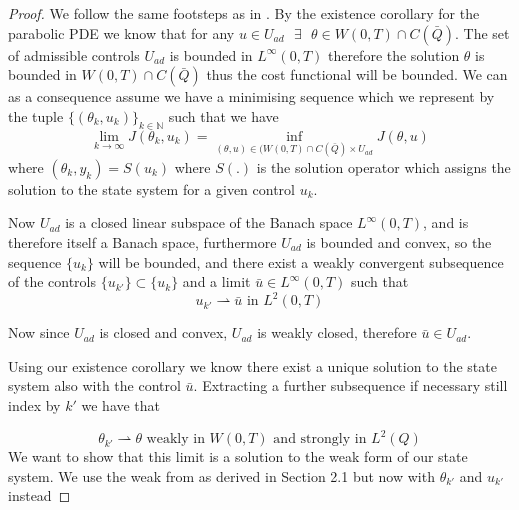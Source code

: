 \begin{proof}
We follow the same footsteps as in  \cite{DPSteel}. By the existence corollary for the parabolic PDE we know that  for any $u \in U_{ad} \text{ } \exists \text{ }\theta \in W(0,T)\cap C(\bar{Q})$. The set of admissible controls $U_{ad}$ is bounded in $L^{\infty}(0,T)$ therefore the solution $\theta$ is bounded in $W(0,T) \cap C(\bar{Q})$ thus the cost functional will be bounded. We can as a consequence assume we have a minimising sequence which we represent by the tuple $\{(\theta_k,u_k)\}_{k\in \mathbb{N}}$ such that we have 
\begin{equation*}
    \lim_{k\rightarrow \infty}J(\theta_k,u_k) = \inf_{(\theta,u)\in (W(0,T) \cap C(\bar{Q})\times U_{ad}}J(\theta,u)
\end{equation*}
where $(\theta_k,y_k) = S(u_k)$ where $S(.)$ is the solution operator which assigns the solution to the state system for a given control $u_k$.

Now $U_{ad}$ is a closed linear subspace of the Banach space $L^{\infty}(0,T)$, and is therefore itself a  Banach space, furthermore $U_{ad}$ is bounded and convex, so the sequence $\{u_k\}$ will be bounded, and there exist a weakly convergent subsequence of the controls $\{u_{k'} \} \subset \{u_k \}$ and a limit $\bar{u} \in L^{\infty}(0,T)$ such that
\begin{equation*}
    u_{k'} \rightharpoonup \bar{u} \text{ in } L^2(0,T)
\end{equation*}

Now since $U_{ad}$ is closed and convex, $U_{ad}$ is weakly closed, therefore $\bar{u} \in U_{ad}$. \bigskip

Using our existence corollary we know there exist a unique solution to the state system also with the control $\bar{u}$. Extracting a further subsequence if necessary still index by $k'$ we have that 

\begin{equation*}
    \theta_{k'} \rightharpoonup \theta \text{ weakly in } W(0,T) \text{ and strongly in } L^2(Q)
\end{equation*}
We want to show that this limit is a solution to the weak form of our state system. We use the weak from as derived in Section 2.1 but now with $\theta_{k'}$ and $u_{k'}$ instead 


\end{proof}
